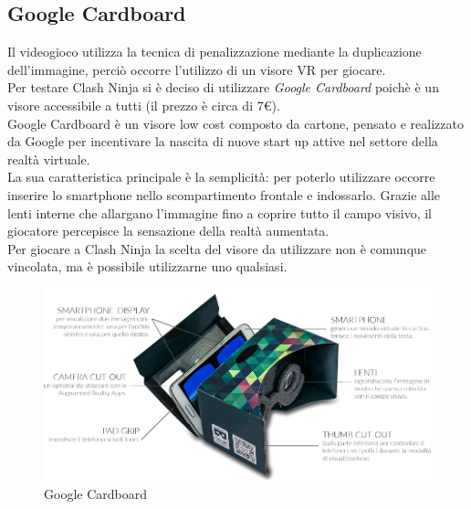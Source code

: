\documentclass[12pt,a4paper,openright,twoside]{book}
\begin{document}
	\subsection{Google Cardboard}
	Il videogioco utilizza la tecnica di penalizzazione mediante la duplicazione dell'immagine, perciò occorre l'utilizzo di un visore VR per giocare.\\
	Per testare Clash Ninja si è deciso di utilizzare \textit{Google Cardboard} poichè è un visore accessibile a tutti (il prezzo è circa di 7\euro).\\
	Google Cardboard è un visore low cost composto da cartone, pensato e realizzato da Google per incentivare la nascita di nuove start up attive nel settore della realtà virtuale.\\
	La sua caratteristica principale è la semplicità: per poterlo utilizzare occorre inserire lo smartphone nello scompartimento frontale e indossarlo. Grazie alle lenti interne che allargano l'immagine fino a coprire tutto il campo visivo, il giocatore percepisce la sensazione della realtà aumentata.\\
	Per giocare a Clash Ninja la scelta del visore da utilizzare non è comunque vincolata, ma è possibile utilizzarne uno qualsiasi.
	
	\begin{figure}[h]
		\centering
		\includegraphics[width=120mm]{googlecardboard.png}
		\caption{Google Cardboard}
		\label{fig:cardboard}
	\end{figure}
\end{document}
